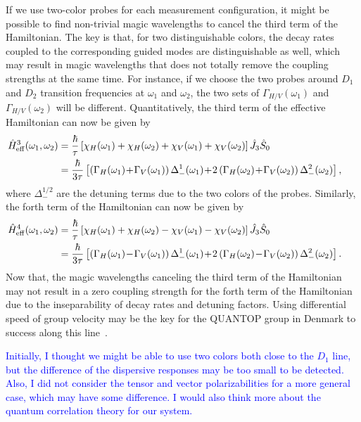 If we use two-color probes for each measurement configuration, it might be possible to find non-trivial magic wavelengths to cancel the third term of the Hamiltonian. The key is that, for two distinguishable colors, the decay rates coupled to the corresponding guided modes are distinguishable as well, which may result in magic wavelengths that does not totally remove the coupling strengths at the same time. For instance, if we choose the two probes around $ D_1 $ and $ D_2 $ transition frequencies at $ \omega_1 $ and $ \omega_2 $, the two sets of $ \Gamma_{H/V}(\omega_1) $ and $ \Gamma_{H/V}(\omega_2) $ will be different. Quantitatively, the third term of the effective Hamiltonian can now be given by
\begin{align}
\!\!\!\!\!\!\!\!\!\!\hat{H}_{\rm eff}^3(\omega_1,\omega_2) &= \frac{\hbar}{\tau} \left[\chi_H(\omega_1)+\chi_H(\omega_2) + \chi_V(\omega_1)+\chi_V(\omega_2) \right] \hat{J}_3\hat{S}_0\\
&= \frac{\hbar}{3\tau} \left[  \left( \Gamma_H(\omega_1)\!+\!\Gamma_V(\omega_1) \right)\Delta_-^1(\omega_1) \!+\! 2\left( \Gamma_H(\omega_2)\!+\!\Gamma_V(\omega_2) \right)\Delta_-^2(\omega_2) \right] ,
\end{align}
where $ \Delta_-^{1/2} $ are the detuning terms due to the two colors of the probes. Similarly, the forth term of the Hamiltonian can now be given by
\begin{align}
\!\!\!\!\!\!\!\!\!\!\hat{H}_{\rm eff}^4(\omega_1,\omega_2) &= \frac{\hbar}{\tau} \left[\chi_H(\omega_1)+\chi_H(\omega_2) - \chi_V(\omega_1)-\chi_V(\omega_2) \right] \hat{J}_3\hat{S}_0\\
&= \frac{\hbar}{3\tau} \left[  \left( \Gamma_H(\omega_1)\!-\!\Gamma_V(\omega_1) \right)\Delta_-^1(\omega_1) \!+\! 2\left( \Gamma_H(\omega_2)\!-\!\Gamma_V(\omega_2) \right)\Delta_-^2(\omega_2) \right] .
\end{align}
Now that, the magic wavelengths canceling the third term of the Hamiltonian may not result in a zero coupling strength for the forth term of the Hamiltonian due to the inseparability of decay rates and detuning factors. Using differential speed of group velocity may be the key for the QUANTOP group in Denmark to success along this line~\cite{Beguin2014}. 

\textcolor{blue}{Initially, I thought we might be able to use two colors both close to the $ D_1 $ line, but the difference of the dispersive responses may be too small to be detected. Also, I did not consider the tensor and vector polarizabilities for a more general case, which may have some difference. I would also think more about the quantum correlation theory for our system. }

